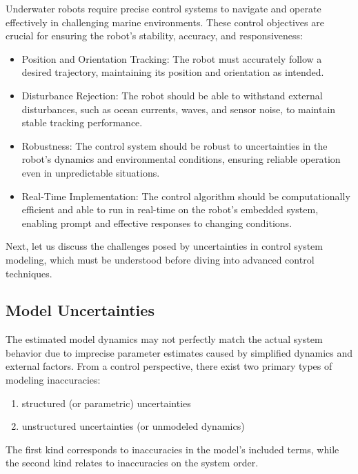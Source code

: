     Underwater robots require precise control systems to navigate and operate effectively
    in challenging marine environments. These control objectives are crucial for ensuring
    the robot's stability, accuracy, and responsiveness:
    \begin{itemize}
        \item Position and Orientation Tracking:
            The robot must accurately follow a desired trajectory, maintaining its position
            and orientation as intended.
        \item Disturbance Rejection:
            The robot should be able to withstand external disturbances, such as ocean
            currents, waves, and sensor noise, to maintain stable tracking performance.
        \item Robustness:
            The control system should be robust to uncertainties in the robot's dynamics
            and environmental conditions, ensuring reliable operation even in unpredictable
            situations.
        \item Real-Time Implementation:
            The control algorithm should be computationally efficient and able to run in
            real-time on the robot's embedded system, enabling prompt and effective
            responses to changing conditions.
    \end{itemize}

    Next, let us discuss the challenges posed by uncertainties in control system modeling, 
    which must be understood before diving into advanced control techniques.

\subsection{Model Uncertainties}

    The estimated model dynamics may not perfectly match the actual system behavior 
    due to imprecise parameter estimates caused by simplified dynamics 
    and external factors. From a control perspective, there exist two primary types 
    of modeling inaccuracies:
    \begin{enumerate}
        \item structured (or parametric) uncertainties
        \item unstructured uncertainties (or unmodeled dynamics)
    \end{enumerate}
    The first kind corresponds to inaccuracies in the model's included terms,
    while the second kind relates to inaccuracies on the
    system order.

